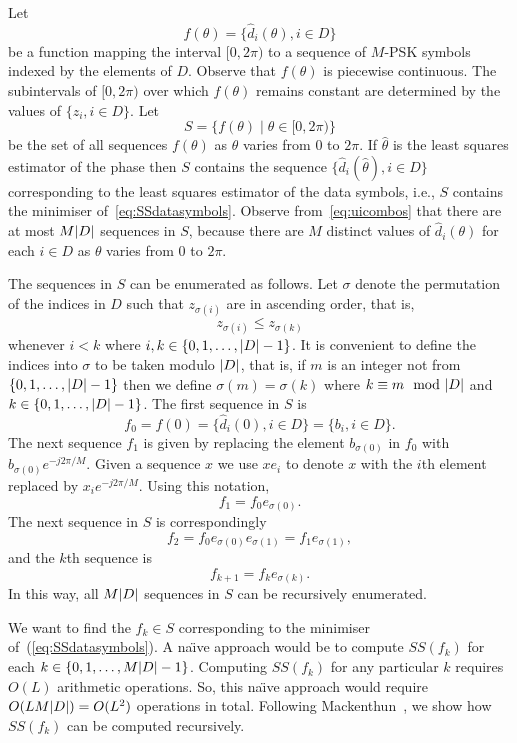 \documentclass[draftcls, onecolumn, 11pt]{IEEEtran}
\begin{document}
Let 
\[
f(\theta) = \{ \hat{d}_i(\theta), i \in D \}
\]
be a function mapping the interval $[0, 2\pi)$ to a sequence of $M$-PSK symbols indexed by the elements of $D$.  Observe that $f(\theta)$ is piecewise continuous.  The subintervals of $[0, 2\pi)$ over which $f(\theta)$ remains constant are determined by the values of $\{z_i, i \in D\}$.  Let
\[
S = \{ f(\theta) \mid \theta \in [0, 2 \pi) \}
\]
be the set of all sequences $f(\theta)$ as $\theta$ varies from $0$ to $2\pi$.  If $\hat{\theta}$ is the least squares estimator of the phase then $S$ contains the sequence $\{ \hat{d}_i(\hat{\theta}), i \in D \}$ corresponding to the least squares estimator of the data symbols, i.e., $S$ contains the minimiser of~\eqref{eq:SSdatasymbols}.  Observe from~\eqref{eq:uicombos} that there are at most $M{\left\vert D \right\vert}$ sequences in $S$, because there are $M$ distinct values of $\hat{d}_i(\theta)$ for each $i \in D$ as $\theta$ varies from $0$ to $2\pi$.

The sequences in $S$ can be enumerated as follows.  Let $\sigma$ denote the permutation of the indices in $D$ such that $z_{\sigma(i)}$ are in ascending order, that is,
\begin{equation}\label{eq:sigmasortind}
z_{\sigma(i)} \leq z_{\sigma(k)}
\end{equation}
whenever $i < k $ where $i, k \in \{0, 1, \dots, {\left\vert D \right\vert}-1\}$.  It is convenient to define the indices into $\sigma$ to be taken modulo ${\left\vert D \right\vert}$, that is, if $m$ is an integer not from $\{0, 1, \dots, {\left\vert D \right\vert}-1\}$ then we define $\sigma(m) = \sigma(k)$ where $k \equiv m \mod \abs{D}$ and $k \in  \{0, 1, \dots, {\left\vert D \right\vert}-1\}$.  The first sequence in $S$ is 
\[
f_0 = f(0) = \{ \hat{d}_i(0), i \in D \} = \{ b_i, i \in D \}.
\]  
The next sequence $f_1$ is given by replacing the element $b_{\sigma(0)}$ in $f_0$ with $b_{\sigma(0)}e^{-j2\pi/M}$.  Given a sequence $x$ we use $x e_i$ to denote $x$ with the $i$th element replaced by $x_i e^{-j2\pi/M}$.  Using this notation,  
\[
f_1 = f_0 e_{\sigma(0)}.
\] 
The next sequence in $S$ is correspondingly 
\[
f_2 = f_0 e_{\sigma(0)} e_{\sigma(1)} = f_1 e_{\sigma(1)},
\]
and the $k$th sequence is
\begin{equation}\label{eq:fkrec}
f_{k+1} = f_{k} e_{\sigma(k)}.
\end{equation}
In this way, all $M{\left\vert D \right\vert}$ sequences in $S$ can be recursively enumerated.

We want to find the $f_k \in S$ corresponding to the minimiser of~(\ref{eq:SSdatasymbols}).  A na\"{\i}ve approach would be to compute $SS(f_k)$ for each $k \in \{0,1,\dots,M{\left\vert D \right\vert}-1\}$.  Computing $SS(f_k)$ for any particular $k$ requires $O(L)$ arithmetic operations.  So, this na\"{\i}ve approach would require $O(L M {\left\vert D \right\vert}) = O(L^2)$ operations in total.  Following Mackenthun~\cite{Mackenthun1994}, we show how $SS(f_k)$ can be computed recursively.
\end{document}
